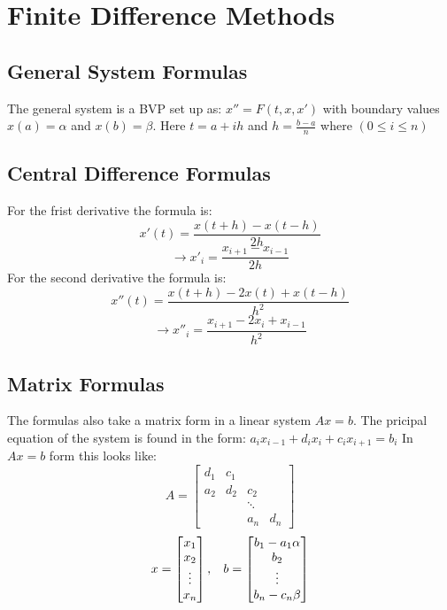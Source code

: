 \section{Finite Difference Methods}

\subsection*{General System Formulas}
The general system is a BVP set up as:
$ x'' = F(t, x, x')$ with boundary values $x(a) = \alpha$ and $x(b) = \beta$.
Here $t = a + ih$ and $h = \frac{b - a}{n}$ where $(0 \leq i \leq n)$
\subsection*{Central Difference Formulas}
For the frist derivative the formula is:
\[
x'(t) = \frac{x(t+h) - x(t-h)}{2h}
\]
\[
\rightarrow x'_{i} = \frac{x_{i+1} - x_{i-1}}{2h}
\]
For the second derivative the formula is:
\[
x''(t) = \frac{x(t+h) - 2 x(t) + x(t-h)}{h^2}
\]
\[
\rightarrow x''_{i} = \frac{x_{i+1} - 2 x_i + x_{i-1}}{h^2}
\]
\subsection*{Matrix Formulas}
The formulas also take a matrix form in a linear system $A x = b$.
The pricipal equation of the system is found in the form:
\newline
$a_i x_{i-1} + d_i x_{i} + c_i x_{i+1} = b_i$
\newline
In $Ax = b$ form this looks like:
\[
A =
\begin{bmatrix}
  d_1 & c_1 & &  \\
  a_2 & d_2 & c_2 &  \\
  & & \ddots &  \\
  & &  a_n & d_n
\end{bmatrix}
\]
\[
x =
\begin{bmatrix}
x_1 \\
x_2 \\
\vdots \\
x_n
\end{bmatrix}
, \hspace{3mm}
b =
\begin{bmatrix}
b_1 - a_1 \alpha \\
b_2 \\
\vdots \\
b_n - c_n \beta
\end{bmatrix}
\]
